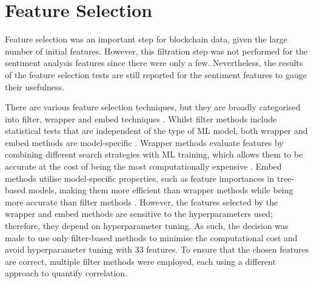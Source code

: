 \documentclass[ %
                    author={Raj Dhakan},
                supervisor={Dr. Ayush Joshi},
                    degree={MSc},
                     title={Ethereum Price Prediction using Internal and External Factors},
                  subtitle={},
                      type={},
                      year={2025}]{dissertation}
\begin{document}
\section{Feature Selection}
Feature selection was an important step for blockchain data, given the large number of initial features. However, this filtration step was not performed for the sentiment analysis features since there were only a few. Nevertheless, the results of the feature selection tests are still reported for the sentiment features to gauge their usefulness.

There are various feature selection techniques, but they are broadly categorised into filter, wrapper and embed techniques \cite{theng2024feature}. Whilst filter methods include statistical tests that are independent of the type of ML model, both wrapper and embed methods are model-specific \cite{theng2024feature}. Wrapper methods evaluate features by combining different search strategies with ML training, which allows them to be accurate at the cost of being the most computationally expensive \cite{theng2024feature}. Embed methods utilise model-specific properties, such as feature importances in tree-based models, making them more efficient than wrapper methods while being more accurate than filter methods \cite{theng2024feature}. However, the features selected by the wrapper and embed methods are sensitive to the hyperparameters used; therefore, they depend on hyperparameter tuning. As such, the decision was made to use only filter-based methods to minimise the computational cost and avoid hyperparameter tuning with 33 features. To ensure that the chosen features are correct, multiple filter methods were employed, each using a different approach to quantify correlation.
\end{document}
